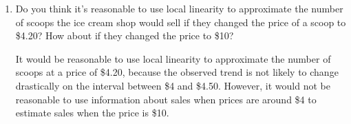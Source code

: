 \documentclass{article}
\begin{document}
\begin{enumerate}
\begin{enumerate}
  \item
    \begin{problem}
      Do you think it's reasonable to use local linearity to approximate the number of scoops the ice cream shop would sell if they changed the price of a scoop to \$4.20? How about if they changed the price to \$10?
    \end{problem}

    \begin{solution}
      It would be reasonable to use local linearity to approximate the number of scoops at a price of \$4.20,
      because the observed trend is not likely to change drastically on the interval between \$4 and \$4.50.
      However, it would not be reasonable to use information about sales when prices are around \$4 to estimate
      sales when the price is \$10. 
    \end{solution}

  \end{enumerate}

\end{enumerate}
\end{document}
